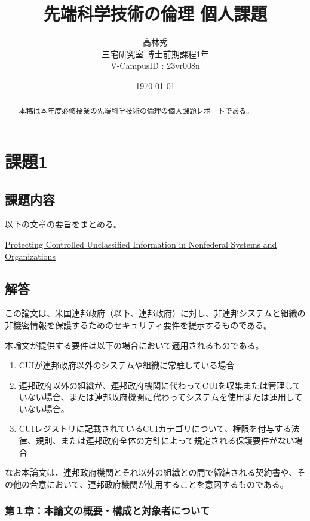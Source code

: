 \documentclass{article}[jsarticle]
\title{先端科学技術の倫理 個人課題}
\author{高林秀 \\ 三宅研究室 博士前期課程1年 \\ V-CampusID : 23vr008n}
\date{\today}
\begin{document}
\maketitle

\begin{abstract}
    本稿は本年度必修授業の先端科学技術の倫理の個人課題レポートである。\par
\end{abstract}

\tableofcontents

\section{課題1}
\subsection{課題内容}
以下の文章の要旨をまとめる。\par
\href{https://nvlpubs.nist.gov/nistpubs/SpecialPublications/NIST.SP.800-171r2.pdf}{Protecting Controlled Unclassified Information in Nonfederal Systems and Organizations}

\subsection{解答}
この論文は、米国連邦政府（以下、連邦政府）に対し、非連邦システムと組織の非機密情報を保護するためのセキュリティ要件を提示するものである。\par
本論文が提供する要件は以下の場合において適用されるものである。
\begin{enumerate}
    \item CUIが連邦政府以外のシステムや組織に常駐している場合
    \item 連邦政府以外の組織が、連邦政府機関に代わってCUIを収集または管理していない場合、または連邦政府機関に代わってシステムを使用または運用していない場合。
    \item CUIレジストリに記載されているCUIカテゴリについて、権限を付与する法律、規則、または連邦政府全体の方針によって規定される保護要件がない場合
\end{enumerate}
なお本論文は、連邦政府機関とそれ以外の組織との間で締結される契約書や、その他の合意において、連邦政府機関が使用することを意図するものである。
\subsubsection{第１章：本論文の概要・構成と対象者について}
\end{document}
